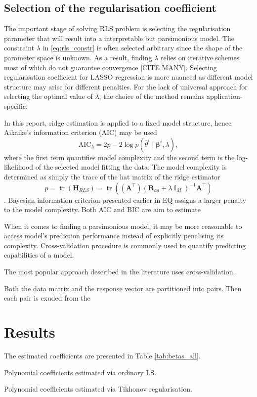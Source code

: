 \documentclass[a4paper,11pt,twoside]{article}
\DeclareMathOperator{\eye}{\mathbb{I}}
\DeclareMathOperator{\tr}{\textrm{tr}}
\theoremstyle{mytheoremstyle}
\begin{document}
\subsection{Selection of the regularisation coefficient}
\par The important stage of solving RLS problem is selecting the regularisation parameter that will result into a interpretable but parsimonious model. The constraint $\lambda$ in \eqref{eq:rls_constr} is often selected arbitrary since the shape of the parameter space is unknown. As a result, finding $\lambda$ relies on iterative schemes most of which do not guarantee convergence [CITE MANY]. Selecting regularisation coefficient for LASSO regression is more nuanced as different model structure may arise for different penalties. For the lack of universal approach for selecting the optimal value of $\lambda$, the choice of the method remains application-specific. 
\par In this report, ridge estimation is applied to a fixed model structure, hence Aikaike’s information criterion (AIC) may be used
\begin{equation}
\text{AIC}_{\lambda} = 2 p - 2\log p(\bar{\theta}^i \mid \mathbf{\beta}^i, \lambda),
\end{equation}
where the first term quantifies model complexity and the second term is the log-likelihood of the selected model fitting the data. The model complexity is determined as simply the trace of the hat matrix of the ridge estimator
\begin{equation}
p = \tr(\mathbf{H}_{RLS}) = \tr((\mathbf{A}^{\top})(\mathbf{R}_{aa} + \lambda \eye_M)^{-1} \mathbf{A}^{\top})
\end{equation}.
Bayesian information criterion presented earlier in EQ assigns a larger penalty to the model complexity. Both AIC and BIC are aim to estimate 
\par When it comes to finding a parsimonious model, it may be more reasonable to access model's prediction performance instead of explicitly penalising its complexity. Cross-validation procedure is commonly used to quantify predicting capabilities of a model.
\par  The most popular approach described in the literature uses cross-validation.

 Both the data matrix and the response vector are partitioned into pairs. Then each pair is exuded from the 
\section{Results}
The estimated coefficients are presented in Table \ref{tab:betas_all}.
\begin{table}[!h]
	\centering
	\caption{Polynomial coefficients estimated via ordinary LS.}\label{tab:betas_all}
	\small
	
\end{table} 
\begin{table}[!h]
	\centering
	\caption{Polynomial coefficients estimated via Tikhonov regularisation.}\label{tab:betas_tikh}
	\small
	
\end{table}
\end{document}
